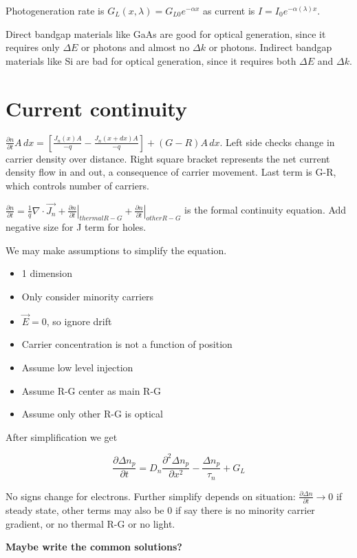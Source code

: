 \documentclass[a4paper,10pt]{article}
\begin{document}
\begin{multicols}{3}
Photogeneration rate is $G_{L}(x,\lambda) = G_{L0}e^{-\alpha x}$ as current is $I = I_{0}e^{-\alpha (\lambda)x}$.

Direct bandgap materials like GaAs are good for optical generation, since it requires only $\Delta E$ or photons and almost no $\Delta k$ or photons. Indirect bandgap materials like Si are bad for optical generation, since it requires both $\Delta E$ and $\Delta k$.

\section*{Current continuity}

$\frac{\partial n}{\partial t} A\,dx = \left[\frac{J_{n}(x)A}{-q}-\frac{J_{n}(x+dx)A}{-q}\right] + (G-R)A\,dx$. Left side checks change in carrier density over distance. Right square bracket represents the net current density flow in and out, a consequence of carrier movement. Last term is G-R, which controls number of carriers.

$\frac{\partial n}{\partial t} = \frac{1}{q} \nabla\cdot\vec{J_{n}} + \left.\frac{\partial n}{\partial t}\right|_{thermal R-G} + \left.\frac{\partial n}{\partial t}\right|_{other R-G}$ is the formal continuity equation. Add negative size for J term for holes.

We may make assumptions to simplify the equation.

\begin{itemize}[noitemsep, topsep=0pt, left=0pt]
    \item 1 dimension
    \item Only consider minority carriers
    \item $\vec{E} = 0$, so ignore drift
    \item Carrier concentration is not a function of position
    \item Assume low level injection
    \item Assume R-G center as main R-G
    \item Assume only other R-G is optical
\end{itemize}

After simplification we get

$$\frac{\partial \Delta n_p}{\partial t} = D_n \frac{\partial^2 \Delta n_p}{\partial x^2} - \frac{\Delta n_p}{\tau_n} + G_L$$

No signs change for electrons. Further simplify depends on situation: $\frac{\partial \Delta n}{\partial t} \rightarrow 0$ if steady state, other terms may also be 0 if say there is no minority carrier gradient, or no thermal R-G or no light.

\textbf{Maybe write the common solutions?}

\end{multicols}
\end{document}

